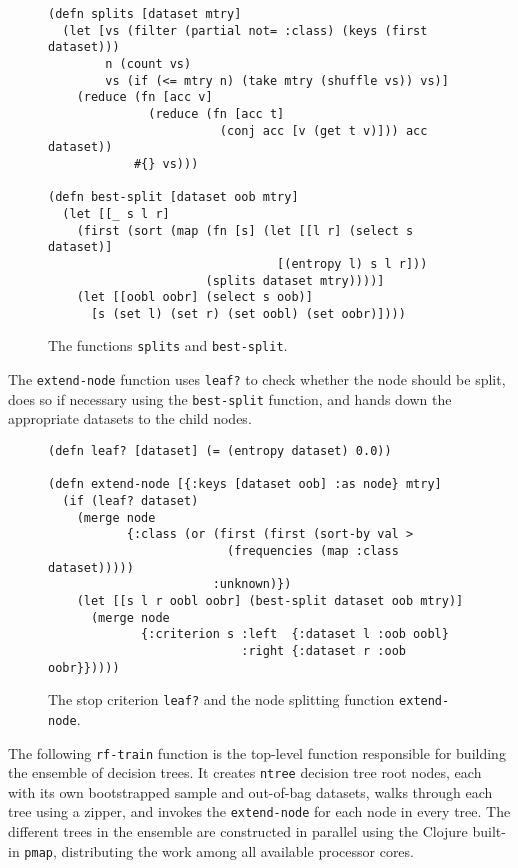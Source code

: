 \documentclass[a4paper,man,12pt,apacite,floatsintext]{apa6} %
\begin{document}
\begin{figure}[H]
\caption{The functions \texttt{splits} and \texttt{best-split}.}
\begin{verbatim}
(defn splits [dataset mtry]
  (let [vs (filter (partial not= :class) (keys (first dataset)))
        n (count vs)
        vs (if (<= mtry n) (take mtry (shuffle vs)) vs)]
    (reduce (fn [acc v]
              (reduce (fn [acc t]
                        (conj acc [v (get t v)])) acc dataset))
            #{} vs)))

(defn best-split [dataset oob mtry]
  (let [[_ s l r]
    (first (sort (map (fn [s] (let [[l r] (select s dataset)]
                                [(entropy l) s l r]))
                      (splits dataset mtry))))]
    (let [[oobl oobr] (select s oob)]
      [s (set l) (set r) (set oobl) (set oobr)])))
\end{verbatim}
\end{figure}

The \texttt{extend-node} function uses \texttt{leaf?} to check whether the node
should be split, does so if necessary using the \texttt{best-split} function, and
hands down the appropriate datasets to the child nodes.

\begin{figure}[H]
\caption{The stop criterion \texttt{leaf?} and the node splitting function \texttt{extend-node}.}
\begin{verbatim}
(defn leaf? [dataset] (= (entropy dataset) 0.0))

(defn extend-node [{:keys [dataset oob] :as node} mtry]
  (if (leaf? dataset)
    (merge node
           {:class (or (first (first (sort-by val >
                         (frequencies (map :class dataset)))))
                       :unknown)})
    (let [[s l r oobl oobr] (best-split dataset oob mtry)]
      (merge node
             {:criterion s :left  {:dataset l :oob oobl}
                           :right {:dataset r :oob oobr}}))))
\end{verbatim}
\end{figure}

The following \texttt{rf-train} function is the top-level function responsible for
building the ensemble of decision trees.
It creates \texttt{ntree} decision tree root nodes, each with its own bootstrapped sample
and out-of-bag datasets, walks through each tree using a zipper,
and invokes the \texttt{extend-node} for each node in every tree.
The different trees in the ensemble are constructed in parallel using the Clojure built-in \texttt{pmap},
distributing the work among all available processor cores.
\end{document}
